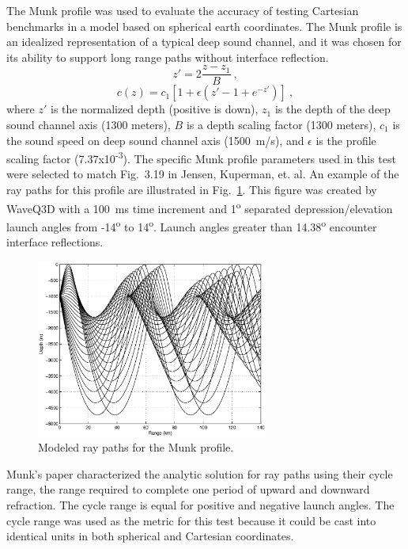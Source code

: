 \documentclass{ws-jca}
\begin{document}
The Munk profile\cite{Munk1974} was used to evaluate the accuracy of
testing Cartesian benchmarks in a model based on spherical earth
coordinates. The Munk profile is an idealized representation of a typical
deep sound channel, and it was chosen for its ability to support long range
paths without interface reflection. 
\begin{equation}
	z' = 2 \frac{z-z_1}{B} \:,
	\label{eq:munk_zprime}
\end{equation}
\begin{equation}
	c(z) = c_1 \left[ 1 + \epsilon \left( z' - 1 + e^{-z'} \right) \right] \:,
	\label{eq:munk_profile}
\end{equation}
where
$z'$ is the normalized depth (positive is down),
\(z_1\) is the depth of the deep sound channel axis (1300 meters),
$B$ is a depth scaling factor (1300 meters),
\(c_1\) is the sound speed on deep sound channel axis (1500~m/s), and
\(\epsilon\) is the profile scaling factor (7.37x10\textsuperscript{-3}).
The specific Munk profile parameters used in this test were selected to
match Fig.~3.19 in Jensen, Kuperman, et. al.\cite{Jensen1994,Porter1997} An
example of the ray paths for this profile are illustrated in
Fig.~\ref{fig:munk_rays}. This figure was created by WaveQ3D with a 100~ms
time increment and 1\textsuperscript{o} separated depression/elevation
launch angles from -14\textsuperscript{o} to 14\textsuperscript{o}. Launch
angles greater than 14.38\textsuperscript{o} encounter interface
reflections.
\begin{figure}[th]
	\centerline{\includegraphics[width=3in]{refraction_munk_range_wave.eps}} 
	\vspace*{8pt}
	\caption{Modeled ray paths for the Munk profile. 
	\label{fig:munk_rays}}
\end{figure}

Munk's paper\cite{Munk1974} characterized the analytic solution for ray
paths using their cycle range, the range required to complete one period of
upward and downward refraction. The cycle range is equal for positive and
negative launch angles. The cycle range was used as the metric for this test
because it could be cast into identical units in both spherical and Cartesian
coordinates. 
\end{document}
